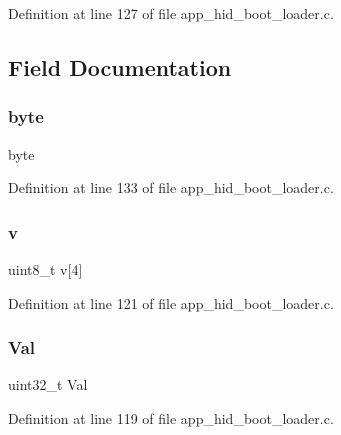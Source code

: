 Definition at line 127 of file app\+\_\+hid\+\_\+boot\+\_\+loader.\+c.



\subsection{Field Documentation}
\mbox{\label{unionuint32__t___v_a_l_a82b52bf2b45e214a8f2100ebfdf1aee4}} 
\subsubsection{\texorpdfstring{byte}{byte}}
{\footnotesize\ttfamily byte}



Definition at line 133 of file app\+\_\+hid\+\_\+boot\+\_\+loader.\+c.

\mbox{\label{unionuint32__t___v_a_l_a29aa7d44788bbf3b5150157df15cb23b}} 
\subsubsection{\texorpdfstring{v}{v}}
{\footnotesize\ttfamily uint8\+\_\+t v\mbox{[}4\mbox{]}}



Definition at line 121 of file app\+\_\+hid\+\_\+boot\+\_\+loader.\+c.

\mbox{\label{unionuint32__t___v_a_l_a4497b7ccdd35adfe3656ecc961faad01}} 
\subsubsection{\texorpdfstring{Val}{Val}}
{\footnotesize\ttfamily uint32\+\_\+t Val}



Definition at line 119 of file app\+\_\+hid\+\_\+boot\+\_\+loader.\+c.

\mbox{\label{unionuint32__t___v_a_l_a69584ba90b098f23df3702374e594862}} 
